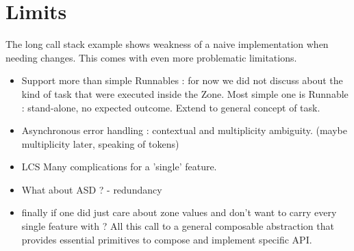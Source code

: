 \section{Limits}

The long call stack example shows weakness of a naive implementation when needing changes. This comes with even more problematic limitations.

\begin{itemize}
\item Support more than simple Runnables : for now we did not discuss about the kind of task that were executed inside the Zone. Most simple one is Runnable : stand-alone, no expected outcome. Extend to general concept of task.
\item Asynchronous error handling : contextual and multiplicity ambiguity. (maybe multiplicity later, speaking of tokens)
\item LCS Many complications for a 'single' feature.
\item What about ASD ? - redundancy
\item finally if one did just care about zone values and don't want to carry every single feature with ? All this call to a general composable abstraction that provides essential primitives to compose and implement specific API.
\end{itemize}